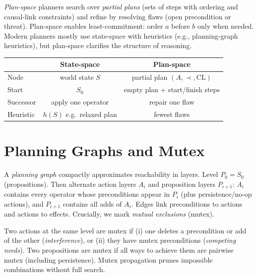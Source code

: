 \emph{Plan-space} planners search over \emph{partial plans} (sets of steps with ordering and causal-link constraints) and refine by resolving flaws (open precondition or threat). Plan-space enables least-commitment: order $a$ before $b$ only when needed. Modern planners mostly use state-space with heuristics (e.g., planning-graph heuristics), but plan-space clarifies the structure of reasoning.

\begin{center}
\small\begin{tabular}{lcc}
\toprule
& State-space & Plan-space\\
\midrule
Node & world state $S$ & partial plan $(A,\prec,\text{CL})$\\
Start & $S_0$ & empty plan + start/finish steps\\
Successor & apply one operator & repair one flaw\\
Heuristic & $h(S)$ e.g.\ relaxed plan & fewest flaws\\
\bottomrule
\end{tabular}
\end{center}

\section{Planning Graphs and Mutex}
\label{sec:planning-graph}

A \emph{planning graph} compactly approximates reachability in layers. Level $P_0=S_0$ (propositions). Then alternate action layers $A_i$ and proposition layers $P_{i+1}$: $A_i$ contains every operator whose preconditions appear in $P_i$ (plus persistence/no-op actions), and $P_{i+1}$ contains all adds of $A_i$. Edges link preconditions to actions and actions to effects. Crucially, we mark \emph{mutual exclusions} (mutex).

Two actions at the same level are mutex if (i) one deletes a precondition or add of the other (\emph{interference}), or (ii) they have mutex preconditions (\emph{competing needs}). Two propositions are mutex if all ways to achieve them are pairwise mutex (including persistence). Mutex propagation prunes impossible combinations without full search.

